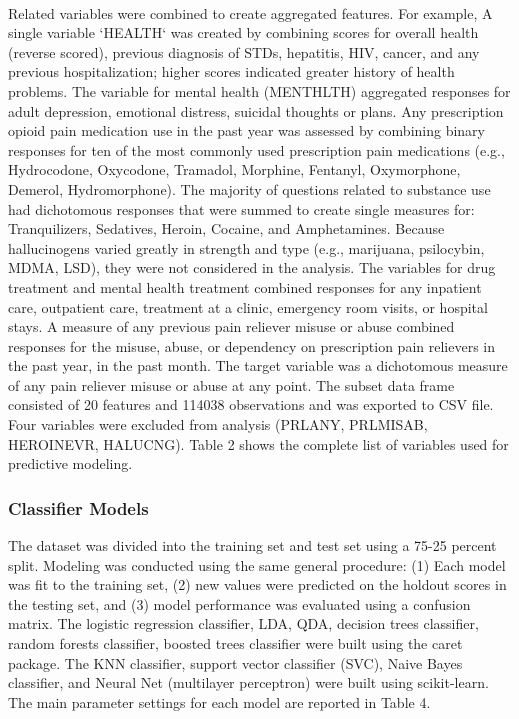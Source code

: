 \\\documentclass[sigconf]{acmart}
\begin{document}
Related variables were combined to create aggregated features. For example, 
A single variable `HEALTH` was created by combining scores for overall health 
(reverse scored), previous diagnosis of STDs, hepatitis, HIV, cancer, and 
any previous hospitalization; higher scores indicated greater history of 
health problems. The variable for mental health (MENTHLTH) aggregated responses 
for adult depression, emotional distress, suicidal thoughts or plans. Any 
prescription opioid pain medication use in the past year was assessed by 
combining binary responses for ten of the most commonly used prescription 
pain medications (e.g., Hydrocodone, Oxycodone, Tramadol, Morphine, Fentanyl, 
Oxymorphone, Demerol, Hydromorphone). The majority of questions related to 
substance use had dichotomous responses that were summed to create single
measures for: Tranquilizers, Sedatives, Heroin, Cocaine, and Amphetamines. 
Because hallucinogens varied greatly in strength and type (e.g., marijuana, 
psilocybin, MDMA, LSD), they were not considered in the analysis. The 
variables for drug treatment and mental health treatment combined responses 
for any inpatient care, outpatient care, treatment at a clinic, emergency room 
visits, or hospital stays. A measure of any previous pain reliever misuse or 
abuse combined responses for the misuse, abuse, or dependency on prescription 
pain relievers in the past year, in the past month. The target variable was a 
dichotomous measure of any pain reliever misuse or abuse at any point. The 
subset data frame consisted of 20 features and 114038 observations and was 
exported to CSV file. Four variables were excluded from analysis (PRLANY, 
PRLMISAB, HEROINEVR, HALUCNG). Table 2 shows the complete list of 
variables used for predictive modeling. 


\subsubsection{Classifier Models}

The dataset was divided into the training set and test set using a 75-25 
percent split. Modeling was conducted using the same general procedure: 
(1) Each model was fit to the training set, (2) new values were predicted 
on the holdout scores in the testing set, and (3) model performance was 
evaluated using a confusion matrix.  The logistic regression classifier, 
LDA, QDA, decision trees classifier, random forests classifier, boosted 
trees classifier were built using the caret package. The KNN classifier, 
support vector classifier (SVC), Naive Bayes classifier, and Neural Net 
(multilayer perceptron) were built using scikit-learn. The main parameter 
settings for each model are reported in Table 4. 
\end{document}
